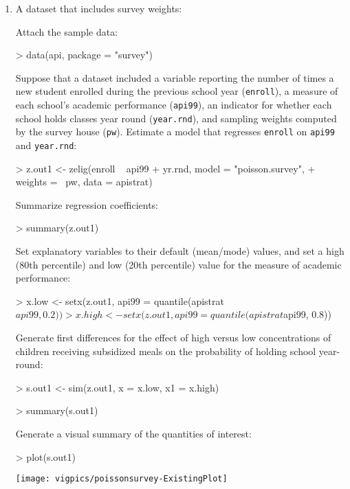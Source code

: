 \begin{enumerate} 

\item A dataset that includes survey weights:

Attach the sample data: 
\begin{Schunk}
\begin{Sinput}
> data(api, package = "survey")
\end{Sinput}
\end{Schunk}

Suppose that a dataset included a variable reporting the number of
times a new student enrolled during the previous school year ({\tt enroll}), 
a measure of each school's academic performance ({\tt api99}), 
an indicator for whether each school holds classes year round ({\tt year.rnd}), and sampling 
weights computed by the survey house ({\tt pw}).  Estimate a model
that regresses {\tt enroll} on {\tt api99} and {\tt year.rnd}:
\begin{Schunk}
\begin{Sinput}
> z.out1 <- zelig(enroll ~ api99 + yr.rnd, model = "poisson.survey", 
+     weights = ~pw, data = apistrat)
\end{Sinput}
\end{Schunk}
Summarize regression coefficients:
\begin{Schunk}
\begin{Sinput}
> summary(z.out1)
\end{Sinput}
\end{Schunk}
Set explanatory variables to their default (mean/mode) values, and
set a high (80th percentile) and low (20th percentile) value for
the measure of academic performance:
\begin{Schunk}
\begin{Sinput}
> x.low <- setx(z.out1, api99 = quantile(apistrat$api99, 0.2))
> x.high <- setx(z.out1, api99 = quantile(apistrat$api99, 0.8))
\end{Sinput}
\end{Schunk}
Generate first differences for the
effect of high versus low concentrations of children receiving
subsidized meals on the probability of holding school year-round: 
\begin{Schunk}
\begin{Sinput}
> s.out1 <- sim(z.out1, x = x.low, x1 = x.high)
\end{Sinput}
\end{Schunk}
\begin{Schunk}
\begin{Sinput}
> summary(s.out1)
\end{Sinput}
\end{Schunk}
Generate a visual summary of the quantities of interest:
\begin{center}
\begin{Schunk}
\begin{Sinput}
> plot(s.out1)
\end{Sinput}
\end{Schunk}
\texttt{[image: vigpics/poissonsurvey-ExistingPlot]}
\end{center}


\end{enumerate}
